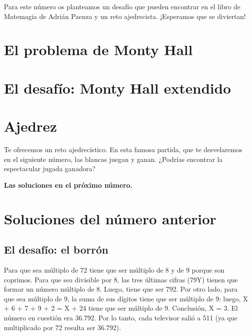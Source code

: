 \begin{multicols}{2}

\cappar

Para este número os planteamos un desafío que pueden encontrar en el libro de Matemagia de Adrián Paenza y un reto ajedrecista. ¡Esperamos que se diviertan! 

\section*{El problema de Monty Hall}


\section{El desafío: Monty Hall extendido}

\section*{Ajedrez}

Te ofrecemos un reto ajedrecístico. En esta famosa partida, que te desvelaremos en el siguiente número, 
las blancas juegan y ganan. ¿Podrías encontrar la espectacular jugada ganadora?

\newgame
{}
\begin{center}
\showboard 
\end{center}

{\bf Las soluciones en el próximo número.}
\section*{\textcolor{redsol}{Soluciones del número anterior}}
\subsection*{El desafío: el borrón}
Para que sea múltiplo de 72 tiene que ser múltiplo de 8 y de 9
porque son coprimos. Para que sea divisible por 8, las tres últimas
cifras (79Y) tienen que formar un número múltiplo de 8. Luego,
tiene que ser 792. Por otro lado, para que sea múltiplo de 9, la
suma de sus dígitos tiene que ser múltiplo de 9: luego, X + 6 + 7
+ 9 + 2 = X + 24 tiene que ser múltiplo de 9. Conclusión, X = 3. El
número en cuestión era 36.792. Por lo tanto, cada televisor salió
a  511 (ya que multiplicado por 72 resulta ser 36.792).
\end{multicols}

\newpage




